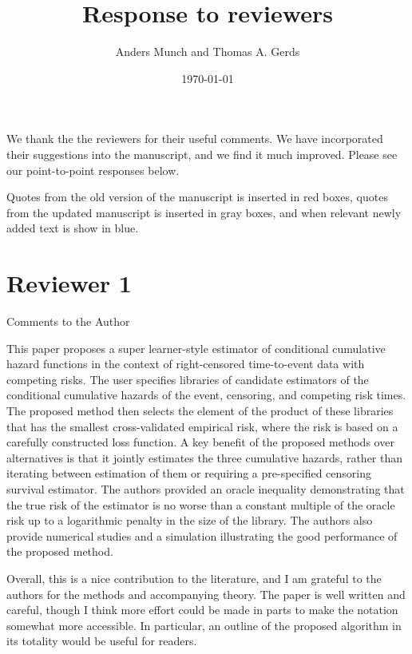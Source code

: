 \documentclass[a4paper,danish]{article}
\author{Anders Munch and Thomas A. Gerds}
\date{\today}
\title{Response to reviewers}
\newcommand{\1}{\mathds{1}}
\newcommand{\answer}[1]{{\vspace{1em}{\bf #1}\vspace{1em}}}
\begin{document}
\maketitle
We thank the the reviewers for their useful comments. We have
incorporated their suggestions into the manuscript, and we find it
much improved. Please see our point-to-point responses below.

Quotes from the old version of the manuscript is inserted in
{\color{red} red} boxes, quotes from the updated manuscript
is inserted in {\color{gray} gray} boxes, and when relevant
newly added text is show in {\color{blue} blue}.


\section*{Reviewer 1}
\label{sec:org8dd4650}

Comments to the Author

This paper proposes a super learner-style estimator of conditional
cumulative hazard functions in the context of right-censored
time-to-event data with competing risks. The user specifies libraries
of candidate estimators of the conditional cumulative hazards of the
event, censoring, and competing risk times. The proposed method then
selects the element of the product of these libraries that has the
smallest cross-validated empirical risk, where the risk is based on a
carefully constructed loss function. A key benefit of the proposed
methods over alternatives is that it jointly estimates the three
cumulative hazards, rather than iterating between estimation of them
or requiring a pre-specified censoring survival estimator. The authors
provided an oracle inequality demonstrating that the true risk of the
estimator is no worse than a constant multiple of the oracle risk up
to a logarithmic penalty in the size of the library. The authors also
provide numerical studies and a simulation illustrating the good
performance of the proposed method.

Overall, this is a nice contribution to the literature, and I am
grateful to the authors for the methods and accompanying theory. The
paper is well written and careful, though I think more effort could
be made in parts to make the notation somewhat more accessible. In
particular, an outline of the proposed algorithm in its totality
would be useful for readers.

 \answer{Thank you for this comment, we agree that it is a good
idea with an outline of the proposed algorithm. We have added a
pseudo-algorithm to the paper.}
\end{document}
